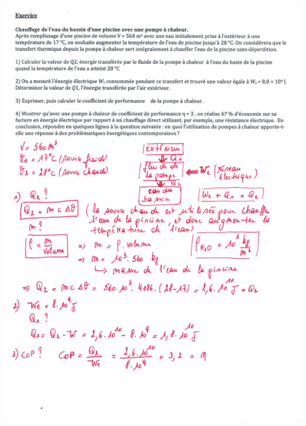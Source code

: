 \includegraphics[width=19.239cm,height=26.975cm]{Pictures/100000010000025300000343FDF0776EAA696B9B.png}

